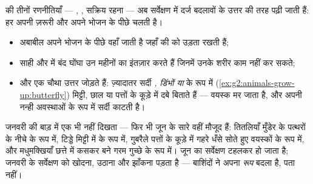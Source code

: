 \begin{proposition}[जंतुओं के उत्तर, सर्वेक्षण की भाषा में]\label{prop:g6:life-through-seasons:animals}
 की तीनों रणनीतियाँ --- ,
, सक्रिय रहना --- अब सर्वेक्षण में दर्ज बदलावों के उत्तर की
तरह पढ़ी जाती हैं: हर  अपनी ज़रूरी  और अपने भोजन के
पीछे चलती है।
\begin{itemize}
  \item अबाबील अपने भोजन के पीछे वहाँ जाती है जहाँ की 
         को उड़ता रखती हैं;
  \item साही और  में बंद घोंघा उन महीनों का इंतज़ार करते हैं जिनमें
        उनके शरीर काम नहीं कर सकते;
  \item और  एक चौथा उत्तर जोड़ते हैं: ज़्यादातर सर्दी
        \emph{, डिंभों या } के रूप में
        (\cref{ex:g2:animals-grow-up:butterfly}) मिट्टी, छाल या
        पत्तों के कूड़े में दबे बिताते हैं --- वयस्क मर जाता है, और
         अपनी नन्ही अवस्थाओं के रूप में सर्दी काटती है।
\end{itemize}
\end{proposition}
\admitted

\begin{example}[जून के कीट जनवरी में कहाँ हैं]\label{ex:g6:life-through-seasons:insects}
जनवरी की बाड़ में एक भी  नहीं दिखता --- फिर भी जून के सारे  वहीं
मौजूद हैं: तितलियाँ मुँडेर के पत्थरों के नीचे  के रूप में, टिड्डे
मिट्टी में  के रूप में, गुबरैले पत्तों के कूड़े में गहरे धँसे सोते
हुए वयस्कों के रूप में, और मधुमक्खियाँ छत्ते में कसकर बने गरम गुच्छे के
रूप में। जून का सर्वेक्षण टहलकर हो जाता है; जनवरी के सर्वेक्षण को खोदना,
उठाना और झाँकना पड़ता है --- बाशिंदों ने अपना \emph{रूप} बदला है, पता
नहीं।
\end{example}


